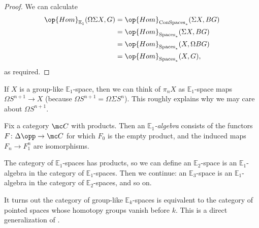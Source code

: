 \documentclass[../notes.tex]{subfiles}
\begin{document}
\begin{proof}
	We can calculate
	\begin{align*}
		\op{Hom}_{\mathbb E_1}(\Omega\Sigma X,G) &= \op{Hom}_{\mathrm{ConSpaces}_*}(\Sigma X,BG) \\
		&= \op{Hom}_{\mathrm{Spaces}_*}(\Sigma X,BG) \\
		&= \op{Hom}_{\mathrm{Spaces}_*}(X,\Omega BG) \\
		&= \op{Hom}_{\mathrm{Spaces}_*}(X,G),
	\end{align*}
	as required.
\end{proof}
\begin{example}
	If $X$ is a group-like $\mathbb E_1$-space, then we can think of $\pi_nX$ as $\mathbb E_1$-space maps $\Omega S^{n+1}\to X$ (because $\Omega S^{n+1}=\Omega\Sigma S^n$). This roughly explains why we may care about $\Omega S^{n+1}$.
\end{example}
\begin{defihelper} 
	Fix a category $\mc C$ with products. Then an \textit{$\mathbb E_1$-algebra} consists of the functors $F\colon\Delta\opp\to\mc C$ for which $F_0$ is the empty product, and the induced maps $F_n\to F_1^n$ are isomorphisms.
\end{defihelper}
\begin{remark}
	The category of $\mathbb E_1$-spaces has products, so we can define an $\mathbb E_2$-space is an $\mathbb E_1$-algebra in the category of $\mathbb E_1$-spaces. Then we continue: an $\mathbb E_3$-space is an $\mathbb E_1$-algebra in the category of $\mathbb E_2$-spaces, and so on.
\end{remark}
\begin{remark}
	It turns out the category of group-like $\mathbb E_k$-spaces is equivalent to the category of pointed spaces whose homotopy groups vanish before $k$. This is a direct generalization of .
\end{remark}
\end{document}
